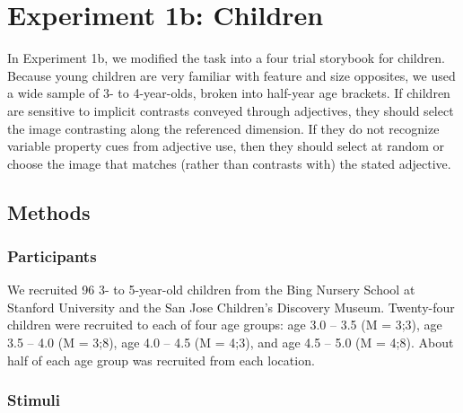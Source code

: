 \documentclass[10pt,letterpaper]{article}
\begin{document}





\section{Experiment 1b: Children} 

In Experiment 1b, we modified the task into a four trial storybook for children.  Because young children are very familiar with feature and size opposites, we used a wide sample of 3- to 4-year-olds, broken into half-year age brackets.    If children are sensitive to implicit contrasts conveyed through adjectives, they should select the image contrasting along the referenced dimension.  If they do not recognize variable property cues from adjective use, then they should select at random or choose the image that matches (rather than contrasts with) the stated adjective. 

\subsection{Methods}

\subsubsection{Participants}

We recruited 96 3- to 5-year-old children from the Bing Nursery School at Stanford University and the San Jose Children's Discovery Museum.  Twenty-four children were recruited to each of four age groups: age 3.0 -- 3.5 (M = 3;3), age 3.5 -- 4.0 (M = 3;8), age 4.0 -- 4.5 (M = 4;3), and age 4.5 -- 5.0 (M = 4;8).  About half of each age group was recruited from each location.

\subsubsection{Stimuli}
\end{document}
